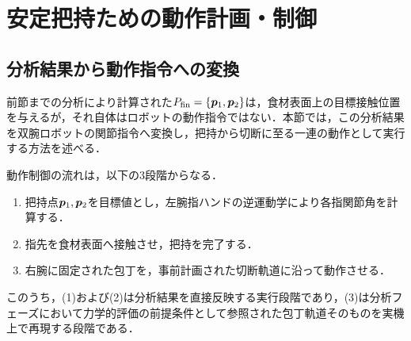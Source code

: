 \begin{algorithm}[H]
\begin{algorithmic}[1]
    \State {}
    \State {}
    \State {}

     \label{algoline:holding_CalDynamicScoreEach-finalscore-st}
        \State {}
        \State {}
    \EndFor

    \State {}
    \State {} \label{algoline:holding_sub-return}
    
\EndFunction
\end{algorithmic}
\end{algorithm}


\section{安定把持ための動作計画・制御}
\label{sec:holding_control}

\subsection{分析結果から動作指令への変換}
\label{subsec:holding_execution}

前節までの分析により計算された{\nameholdingpointset}$\equholdingpointset[fin]=\{\equfingerpoint[][1],\equfingerpoint[][2]\}$は，食材表面上の目標接触位置を与えるが，それ自体はロボットの動作指令ではない．本節では，この分析結果を双腕ロボットの関節指令へ変換し，把持から切断に至る一連の動作として実行する方法を述べる．

動作制御の流れは，以下の3段階からなる．
\begin{enumerate}
    \item 把持点$\equfingerpoint[][1],\equfingerpoint[][2]$を目標値とし，左腕指ハンドの逆運動学により各指関節角を計算する．
    \item 指先を食材表面へ接触させ，把持を完了する．
    \item 右腕に固定された包丁を，事前計画された切断軌道に沿って動作させる．
\end{enumerate}
このうち，(1)および(2)は分析結果を直接反映する実行段階であり，(3)は分析フェーズにおいて力学的評価の前提条件として参照された包丁軌道そのものを実機上で再現する段階である．


